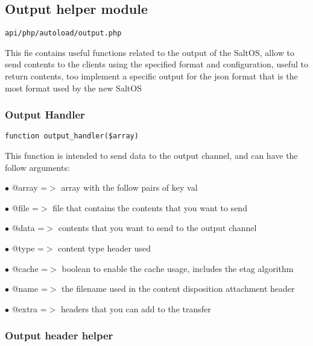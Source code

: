 \documentclass[a4paper]{article}
\begin{document}
\hypertarget{toc183}{}
\subsection{Output helper module}

\begin{lstlisting}
api/php/autoload/output.php
\end{lstlisting}

This fie contains useful functions related to the output of the SaltOS, allow to send contents to
the clients using the specified format and configuration, useful to return contents, too implement
a specific output for the json format that is the most format used by the new SaltOS

\hypertarget{toc184}{}
\subsubsection{Output Handler}

\begin{lstlisting}
function output_handler($array)
\end{lstlisting}

This function is intended to send data to the output channel, and can have
the follow arguments:

\begin{compactitem}
\item[\color{myblue}$\bullet$] @array =$>$ array with the follow pairs of key val
\item[\color{myblue}$\bullet$] @file  =$>$ file that contains the contents that you want to send
\item[\color{myblue}$\bullet$] @data  =$>$ contents that you want to send to the output channel
\item[\color{myblue}$\bullet$] @type  =$>$ content type header used
\item[\color{myblue}$\bullet$] @cache =$>$ boolean to enable the cache usage, includes the etag algorithm
\item[\color{myblue}$\bullet$] @name  =$>$ the filename used in the content disposition attachment header
\item[\color{myblue}$\bullet$] @extra =$>$ headers that you can add to the transfer
\end{compactitem}

\hypertarget{toc185}{}
\subsubsection{Output header helper}
\end{document}

